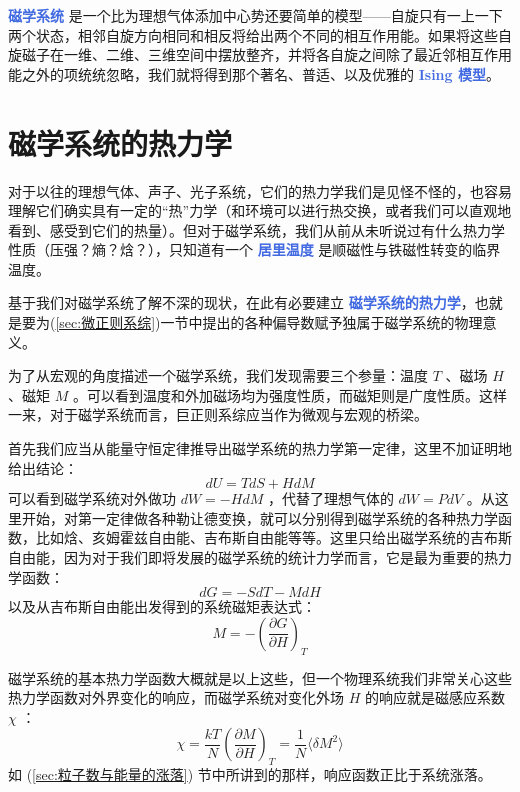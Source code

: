 \textcolor{RoyalBlue}{\textbf{\kaishu 磁学系统}} 是一个比为理想气体添加中心势还要简单的模型——自旋只有一上一下两个状态，相邻自旋方向相同和相反将给出两个不同的相互作用能。如果将这些自旋磁子在一维、二维、三维空间中摆放整齐，并将各自旋之间除了最近邻相互作用能之外的项统统忽略，我们就将得到那个著名、普适、以及优雅的 \textcolor{RoyalBlue}{\textbf{\kaishu Ising 模型}}。


\section{磁学系统的热力学}\label{sec:磁学系统的热力学}

对于以往的理想气体、声子、光子系统，它们的热力学我们是见怪不怪的，也容易理解它们确实具有一定的“热”力学（和环境可以进行热交换，或者我们可以直观地看到、感受到它们的热量）。但对于磁学系统，我们从前从未听说过有什么热力学性质（压强？熵？焓？），只知道有一个 \textcolor{RoyalBlue}{\textbf{\kaishu 居里温度}} 是顺磁性与铁磁性转变的临界温度。

基于我们对磁学系统了解不深的现状，在此有必要建立 \textcolor{RoyalBlue}{\textbf{\kaishu 磁学系统的热力学}}，也就是要为(\ref*{sec:微正则系综})一节中提出的各种偏导数赋予独属于磁学系统的物理意义。

为了从宏观的角度描述一个磁学系统，我们发现需要三个参量：温度 $T$ 、磁场 $H$ 、磁矩 $M$ 。可以看到温度和外加磁场均为强度性质，而磁矩则是广度性质。这样一来，对于磁学系统而言，巨正则系综应当作为微观与宏观的桥梁。

首先我们应当从能量守恒定律推导出磁学系统的热力学第一定律，这里不加证明地给出结论：
\begin{equation}\label{equ:磁学系统的热力学第一定律}
    dU = TdS +HdM
\end{equation}
可以看到磁学系统对外做功 $dW = -HdM$ ，代替了理想气体的 $dW = PdV$ 。从这里开始，对第一定律做各种勒让德变换，就可以分别得到磁学系统的各种热力学函数，比如焓、亥姆霍兹自由能、吉布斯自由能等等。这里只给出磁学系统的吉布斯自由能，因为对于我们即将发展的磁学系统的统计力学而言，它是最为重要的热力学函数：
\begin{equation}\label{equ:磁学系统的吉布斯自由能}
    dG = -SdT - MdH
\end{equation}
以及从吉布斯自由能出发得到的系统磁矩表达式：
\begin{equation}\label{equ:磁学系统的磁矩表达式}
    M = -\left(\frac{\partial G}{\partial H}\right)_{T}
\end{equation}

磁学系统的基本热力学函数大概就是以上这些，但一个物理系统我们非常关心这些热力学函数对外界变化的响应，而磁学系统对变化外场 $H$ 的响应就是磁感应系数 $\chi$ ：
\begin{equation}\label{equ:磁感应系数}
    \chi = \frac{kT}{N} \left(\frac{\partial M}{\partial H}\right)_{T} = \frac{1}{N} \langle \delta M^2 \rangle
\end{equation}
如 (\ref*{sec:粒子数与能量的涨落}) 节中所讲到的那样，响应函数正比于系统涨落。

